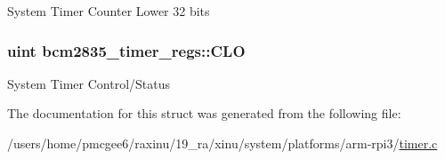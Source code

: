 System Timer Counter Lower 32 bits \hypertarget{structbcm2835__timer__regs_a744e7ce6232cea0977a51428d42dc20a}{
\subsubsection[{C\-L\-O}]{\setlength{\rightskip}{0pt plus 5cm}uint bcm2835\-\_\-timer\-\_\-regs\-::\-C\-L\-O}}\label{structbcm2835__timer__regs_a744e7ce6232cea0977a51428d42dc20a}
System Timer Control/\-Status 

The documentation for this struct was generated from the following file\-:\begin{DoxyCompactItemize}
\item 
/users/home/pmcgee6/raxinu/19\-\_\-ra/xinu/system/platforms/arm-\/rpi3/\hyperlink{timer_8c}{timer.\-c}\end{DoxyCompactItemize}
